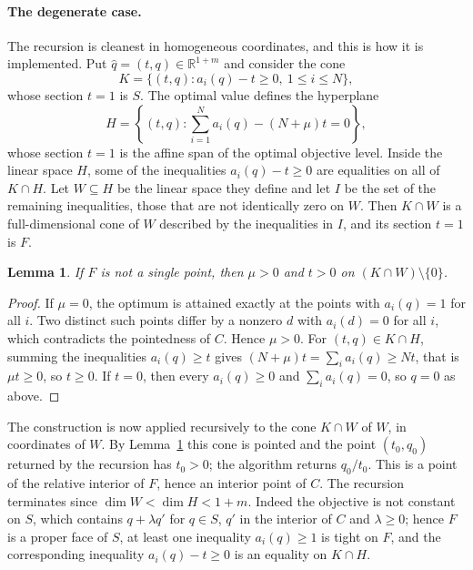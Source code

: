 \documentclass{amsart}
\newtheorem{lemma}{Lemma}
\newcommand{\RR}{\mathbb{R}}
\begin{document}
\paragraph{The degenerate case.}
The recursion is cleanest in homogeneous coordinates, and this is how it is
implemented.  Put \(\hat q=(t,q)\in\RR^{1+m}\) and consider the cone
\begin{equation}
  K=\{(t,q) : a_i(q)-t\geq 0,\ 1\leq i\leq N\},
\end{equation}
whose section \(t=1\) is \(S\).  The optimal value defines the hyperplane
\begin{equation}
  H=\left\{(t,q) : \sum_{i=1}^N a_i(q)-(N+\mu)t=0\right\},
\end{equation}
whose section \(t=1\) is the affine span of the optimal objective level.
Inside the linear space \(H\), some of the inequalities \(a_i(q)-t\geq 0\)
are equalities on all of \(K\cap H\).  Let \(W\subseteq H\) be the linear
space they define and let \(I\) be the set of the remaining inequalities,
those that are not identically zero on \(W\).  Then \(K\cap W\) is a
full-dimensional cone of \(W\) described by the inequalities in \(I\), and
its section \(t=1\) is \(F\).

\begin{lemma}\label{lem:positive_t}
If \(F\) is not a single point, then \(\mu>0\) and \(t>0\) on
\((K\cap W)\setminus\{0\}\).
\end{lemma}

\begin{proof}
If \(\mu=0\), the optimum is attained exactly at the points with
\(a_i(q)=1\) for all \(i\).  Two distinct such points differ by a nonzero
\(d\) with \(a_i(d)=0\) for all \(i\), which contradicts the pointedness of
\(C\).  Hence \(\mu>0\).  For \((t,q)\in K\cap H\), summing the inequalities
\(a_i(q)\geq t\) gives \((N+\mu)t=\sum_i a_i(q)\geq Nt\), that is
\(\mu t\geq 0\), so \(t\geq 0\).  If \(t=0\), then every \(a_i(q)\geq 0\)
and \(\sum_i a_i(q)=0\), so \(q=0\) as above.
\end{proof}

The construction is now applied recursively to the cone \(K\cap W\) of \(W\),
in coordinates of \(W\).  By Lemma~\ref{lem:positive_t} this cone is pointed
and the point \((t_0,q_0)\) returned by the recursion has \(t_0>0\); the
algorithm returns \(q_0/t_0\).  This is a point of the relative interior of
\(F\), hence an interior point of \(C\).  The recursion terminates since
\(\dim W<\dim H<1+m\).  Indeed the objective is not constant on \(S\), which
contains \(q+\lambda q'\) for \(q\in S\), \(q'\) in the interior of \(C\) and
\(\lambda\geq 0\); hence \(F\) is a proper face of \(S\), at least one
inequality \(a_i(q)\geq 1\) is tight on \(F\), and the corresponding
inequality \(a_i(q)-t\geq 0\) is an equality on \(K\cap H\).
\end{document}
